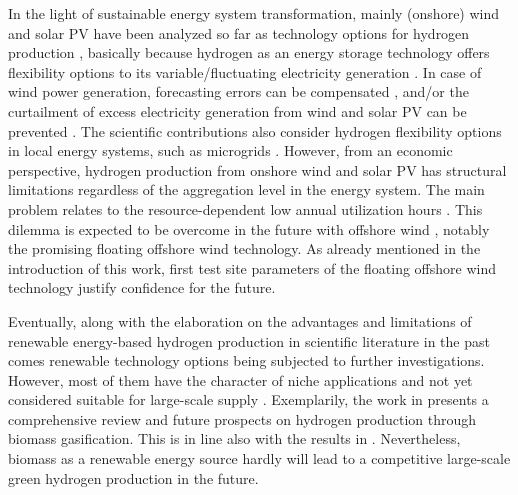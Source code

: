 \documentclass[review]{elsarticle}
\begin{document}
In the light of sustainable energy system transformation, mainly (onshore) wind and solar PV have been analyzed so far as technology options for hydrogen production \cite{nematollahi2019techno}, basically because hydrogen as an energy storage technology offers flexibility options to its variable/fluctuating electricity generation \cite{mcpherson2018role}. In case of wind power generation, forecasting errors can be compensated \cite{kroniger2014hydrogen}, and/or the curtailment of excess electricity generation from wind \cite{mcdonagh2020hydrogen} and solar PV \cite{wu2020investment} can be prevented \cite{mcdonagh2019electrofuels}. The scientific contributions also consider hydrogen flexibility options in local energy systems, such as microgrids \cite{li2021multiple, bornapour2017optimal, li2017sizing}. However, from an economic perspective, hydrogen production from onshore wind and solar PV has structural limitations regardless of the aggregation level in the energy system. The main problem relates to the resource-dependent low annual utilization hours \cite{moraes2018comparison, ajanovic2018economic}. This dilemma is expected to be overcome in the future with offshore wind \cite{leahy2020development, mcdonagh2020hydrogen}, notably the promising floating offshore wind technology. As already mentioned in the introduction of this work, first test site parameters of the floating offshore wind technology justify confidence for the future.\vspace{0.3cm}

Eventually, along with the elaboration on the advantages and limitations of renewable energy-based hydrogen production in scientific literature in the past comes renewable technology options being subjected to further investigations. However, most of them have the character of niche applications and not yet considered suitable for large-scale supply \cite{glenk2019economics}. Exemplarily, the work in \cite{cao2020biorenewable} presents a comprehensive review and future prospects on hydrogen production through biomass gasification. This is in line also with the results in \cite{kelly2007potential}. Nevertheless, biomass as a renewable energy source hardly will lead to a competitive large-scale green hydrogen production in the future.\vspace{0.3cm}
\end{document}
